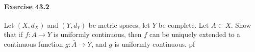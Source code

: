 \documentclass{article}
\begin{document}
\paragraph{Exercise 43.2} Let $(X, d_X)$ and $(Y, d_Y)$ be metric spaces; let $Y$ be complete. Let $A \subset X$. Show that if $f \colon A \rightarrow Y$ is uniformly continuous, then $f$ can be uniquely extended to a continuous function $g \colon \bar{A} \rightarrow Y$, and $g$ is uniformly continuous.
pf
\end{document}
